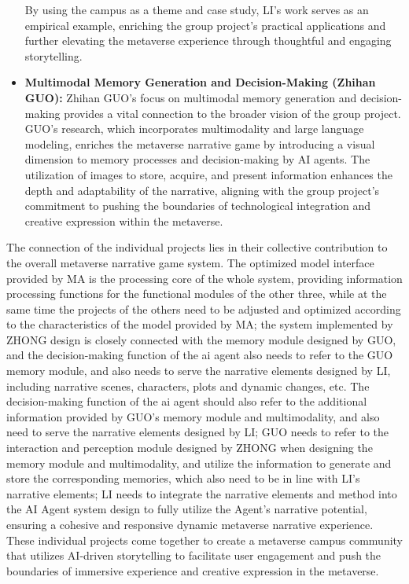 \begin{itemize}
    By using the campus as a theme and case study, LI's work serves as an empirical example, enriching the group project's practical applications and further elevating the metaverse experience through thoughtful and engaging storytelling.
    \item \textbf{Multimodal Memory Generation and Decision-Making (Zhihan GUO):}
    Zhihan GUO's focus on multimodal memory generation and decision-making provides a vital connection to the broader vision of the group project. 
    GUO's research, which incorporates multimodality and large language modeling, enriches the metaverse narrative game by introducing a visual dimension to memory processes and decision-making by AI agents. 
    The utilization of images to store, acquire, and present information enhances the depth and adaptability of the narrative, aligning with the group project's commitment to pushing the boundaries of technological integration and creative expression within the metaverse.
\end{itemize}
The connection of the individual projects lies in their collective contribution to the overall metaverse narrative game system. 
The optimized model interface provided by MA is the processing core of the whole system, providing information processing functions for the functional modules of the other three, 
while at the same time the projects of the others need to be adjusted and optimized according to the characteristics of the model provided by MA; 
the system implemented by ZHONG design is closely connected with the memory module designed by GUO, and the decision-making function of the ai agent also needs to refer to the GUO memory module, 
and also needs to serve the narrative elements designed by LI, including narrative scenes, characters, plots and dynamic changes, etc. 
The decision-making function of the ai agent should also refer to the additional information provided by GUO's memory module and multimodality, and also need to serve the narrative elements designed by LI; 
GUO needs to refer to the interaction and perception module designed by ZHONG when designing the memory module and multimodality, and utilize the information to generate and store the corresponding memories, 
which also need to be in line with LI's narrative elements; LI needs to integrate the narrative elements and method into the AI Agent system design to fully utilize the Agent's narrative potential, ensuring a cohesive and responsive dynamic metaverse narrative experience. 
These individual projects come together to create a metaverse campus community that utilizes AI-driven storytelling to facilitate user engagement and push the boundaries of immersive experience and creative expression in the metaverse.


